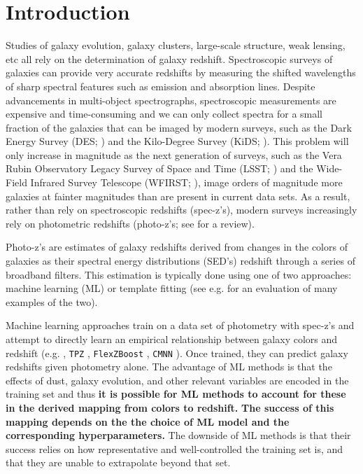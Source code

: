 \documentclass[twocolumn]{aastex63}
\begin{document}

\section{Introduction}
    Studies of galaxy evolution, galaxy clusters, large-scale structure, weak lensing, etc all rely on the determination of galaxy redshift.
    Spectroscopic surveys of galaxies can provide very accurate redshifts by measuring the shifted wavelengths of sharp spectral features such as emission and absorption lines.
    Despite advancements in multi-object spectrographs, spectroscopic measurements are expensive and time-consuming and we can only collect spectra for a small fraction of the galaxies that can be imaged by  modern surveys, such as the Dark Energy Survey (DES; \citealt{TheDarkEnergySurveyCollaboration2005}) and the Kilo-Degree Survey (KiDS; \citealt{DeJong2013a}).
    This problem will only increase in magnitude as the next generation of surveys, such as the Vera Rubin Observatory Legacy Survey of Space and Time (LSST; \citealt{LSSTScienceCollaboration2009}) and the Wide-Field Infrared Survey Telescope (WFIRST; \citealt{Green2012}), image orders of magnitude more galaxies at fainter magnitudes than are present in current data sets.
    As a result, rather than rely on spectroscopic redshifts (spec-z's), modern surveys increasingly rely on photometric redshifts (photo-z's; see \citealt{Salvato2019} for a review).

    Photo-z's are estimates of galaxy redshifts derived from changes in the colors of galaxies as their spectral energy distributions (SED's) redshift through a series of broadband filters.
    This estimation is typically done using one of two approaches: machine learning (ML) or template fitting (see e.g. \citealt{Schmidt2020} for an evaluation of many examples of the two).

    Machine learning approaches train on a data set of photometry with spec-z's and attempt to directly learn an empirical relationship between galaxy colors and redshift (e.g. \citealt{Connolly1995}, \texttt{TPZ} \citealt{Kind2013}, \texttt{FlexZBoost} \citealt{Izbicki2017}, \texttt{CMNN} \citealt{Graham2018a}).
    Once trained, they can predict galaxy redshifts given photometry alone.
    The advantage of ML methods is that the effects of dust, galaxy evolution, and other relevant variables are encoded in the training set and thus \textbf{it is possible for ML methods to account for these in the derived mapping from colors to redshift.}
    \textbf{The success of this mapping depends on the the choice of ML model and the corresponding hyperparameters.}
    The downside of ML methods is that their success relies on how representative and well-controlled the training set is, and that they are unable to extrapolate beyond that set.
\end{document}
